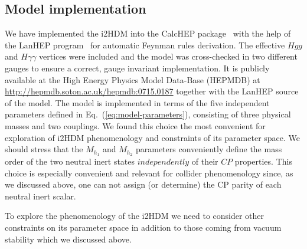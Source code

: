 \subsection{Model implementation}
We have implemented the i2HDM into the CalcHEP package~\cite{CALCHEP}
with the help of the LanHEP program~\cite{Semenov:1998eb,Semenov:2008jy}
for automatic Feynman rules derivation. The effective $Hgg$ and $H\gamma\gamma$ vertices were included and the model was cross-checked in two different gauges
to ensure a correct, gauge invariant implementation.
It is publicly available at the
High Energy Physics Model Data-Base (HEPMDB) \cite{Brooijmans:2012yi} at
\url{http://hepmdb.soton.ac.uk/hepmdb:0715.0187}
together with the LanHEP source of the model.
The model is implemented in terms of the five independent parameters
defined in Eq.~(\ref{eq:model-parameters}), consisting of three physical masses
and two couplings.
We found this choice the most convenient for exploration of i2HDM phenomenology
and constraints of its parameter space.
We should stress that the $M_{h_1}$ and $M_{h_2}$ parameters 
conveniently  define the mass order of the two neutral inert states 
$independently$ of their $CP$ properties. 
This choice is especially convenient and relevant for collider
phenomenology since, as we discussed above, one can not assign (or determine) the CP parity of each neutral inert scalar.

To explore the phenomenology of the i2HDM we need to consider other constraints on its parameter space
in addition to those coming from vacuum stability which we discussed above.

